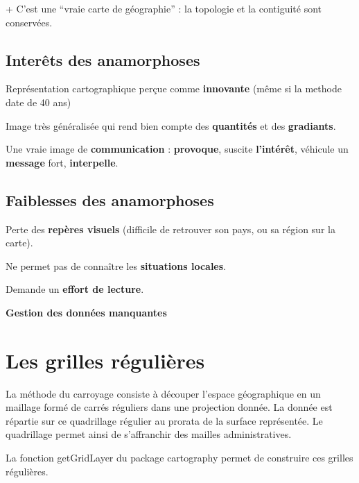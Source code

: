 \documentclass[]{book}
\begin{document}
+ C'est une ``vraie carte de géographie'' : la topologie et la
contiguité sont conservées.

\subsection{Interêts des anamorphoses}\label{interets-des-anamorphoses}

Représentation cartographique perçue comme \textbf{innovante} (même si
la methode date de 40 ans)

Image très généralisée qui rend bien compte des \textbf{quantités} et
des \textbf{gradiants}.

Une vraie image de \textbf{communication} : \textbf{provoque}, suscite
\textbf{l'intérêt}, véhicule un \textbf{message} fort,
\textbf{interpelle}.

\subsection{Faiblesses des
anamorphoses}\label{faiblesses-des-anamorphoses}

Perte des \textbf{repères visuels} (difficile de retrouver son pays, ou
sa région sur la carte).

Ne permet pas de connaître les \textbf{situations locales}.

Demande un \textbf{effort de lecture}.

\textbf{Gestion des données manquantes}

\section{Les grilles régulières}\label{les-grilles-regulieres}

La méthode du carroyage consiste à découper l'espace géographique en un
maillage formé de carrés réguliers dans une projection donnée. La donnée
est répartie sur ce quadrillage régulier au prorata de la surface
représentée. Le quadrillage permet ainsi de s'affranchir des mailles
administratives.

La fonction getGridLayer du package cartography permet de construire ces
grilles régulières.
\end{document}
